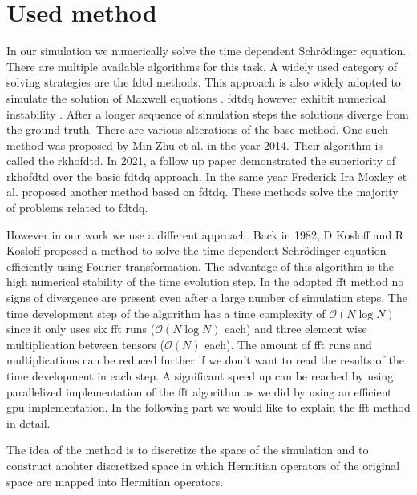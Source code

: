 \section{Used method}
\label{sec:used_method}

In our simulation we numerically solve the time dependent Schrödinger equation.
There are multiple available algorithms for this task.
A widely used category of solving strategies are the \acrfull{fdtd} methods.
This approach is also widely adopted to simulate the solution of Maxwell equations \cite{maxwell1865, Ulf2001}.
\acrfull{fdtdq} however exhibit numerical instability \cite{Soriano2004}.
After a longer sequence of simulation steps the solutions diverge from the ground truth.
There are various alterations of the base method.
One such method was proposed by Min Zhu et al. \cite{Zhu2014} in the year 2014.
Their algorithm is called the \acrfull{rkhofdtd}.
In 2021, a follow up paper \cite{Zhu_Wang_2021} demonstrated the superiority of \acrshort{rkhofdtd} over the basic \acrshort{fdtdq} approach.
In the same year Frederick Ira Moxley et al. \cite{MOXLEY20122434} proposed another method based on \acrshort{fdtdq}.
These methods solve the majority of problems related to \acrshort{fdtdq}.

However in our work we use a different approach.
Back in 1982, D Kosloff and R Kosloff proposed a method \cite{KOSLOFF198335} to solve the time-dependent Schrödinger equation efficiently using Fourier transformation.
The advantage of this algorithm is the high numerical stability of the time evolution step.
In the adopted \acrshort{fft} method no signs of divergence are present even after a large number of simulation steps.
The time development step of the algorithm has a time complexity of $\mathcal{O}(N\log N)$ since it only uses six \acrshort{fft} runs ($\mathcal{O}(N\log N)$ each) and three element wise multiplication between tensors ($\mathcal{O}(N)$ each).
The amount of \acrshort{fft} runs and multiplications can be reduced further if we don't want to read the results of the time development in each step.
A significant speed up can be reached by using parallelized implementation of the \acrshort{fft} algorithm as we did by using an efficient \acrshort{gpu} implementation.
In the following part we would like to explain the \acrshort{fft} method in detail.

The idea of the method is to discretize the space of the simulation and to construct anohter discretized space in which Hermitian operators of the original space are mapped into Hermitian operators. 











